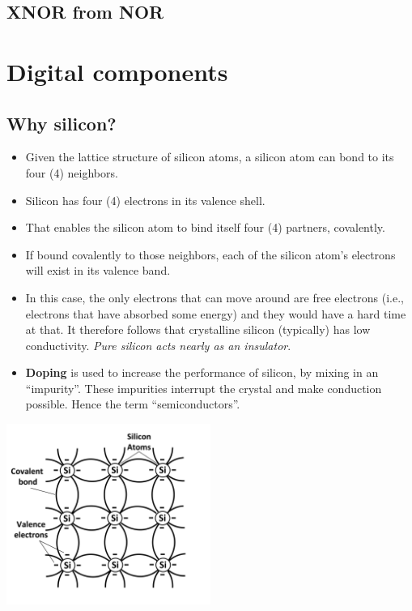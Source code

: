 \documentclass[11pt]{book}
\begin{document}
\subsection{XNOR from NOR}

\newpage
\section{Digital components}
\subsection{Why silicon?}
\begin{itemize}
	\item Given the lattice structure of silicon atoms, a silicon atom can bond to its four (4) neighbors.
	\item Silicon has four (4) electrons in its valence shell.
	\item That enables the silicon atom to bind itself four (4) partners, covalently.  
	\item If bound covalently to those neighbors, each of the silicon atom's electrons will exist in its valence band.
	\item In this case, the only electrons that can move around are free electrons (i.e., electrons that have absorbed some energy) and they would have a hard time at that. It therefore follows that crystalline silicon (typically) has low conductivity. \textit{Pure silicon acts nearly as an insulator}.
	\item \textbf{Doping} is used to increase the performance of silicon, by mixing in an ``impurity''. These impurities interrupt the crystal and make conduction possible. Hence the term ``semiconductors''.
\end{itemize}

\begin{center}
	\includegraphics[width=0.5\textwidth]{figures/19.01.png}
\end{center}
\end{document}
